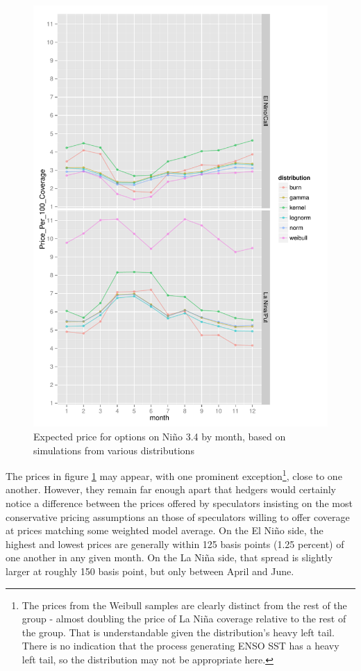 \documentclass[authoryear]{article}
\begin{document}
\begin{figure}[!htbp]
  \includegraphics[width=\linewidth]{Pricingfigs/optionPricesWithVariousDistMonth}
  \caption{Expected price for options on Ni\~no 3.4 by month, based on simulations from various distributions}
   \label{fig:optionPricesWithVariousDistMonth}
\end{figure}

The prices in figure \ref{fig:optionPricesWithVariousDistMonth} may appear, with one prominent exception\footnote{The prices from the Weibull samples are clearly distinct from the rest of the group - almost doubling the price of La Ni\~na coverage relative to the rest of the group. That is understandable given the distribution's heavy left tail. There is no indication that the process generating ENSO SST has a heavy left tail, so the distribution may not be appropriate here.}, close to one another. However, they remain far enough apart that hedgers would certainly notice a difference between the prices offered by speculators insisting on the most conservative pricing assumptions an those of speculators willing to offer coverage at prices matching some weighted model average. On the El Ni\~no side, the highest and lowest prices are generally within 125 basis points (1.25 percent) of one another in any given month. On the La Ni\~na side, that spread is slightly larger at roughly 150 basis point, but only between April and June. 
\end{document}
